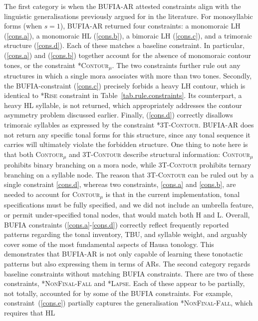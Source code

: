\documentclass{CUP-JNL-PHO}%
\theoremstyle{definition}
\numberwithin{equation}{section}
\theoremstyle{definition}
\begin{document}
The first category is when the BUFIA-AR attested constraints align
with the linguistic generalisations previously argued for in the
literature. For monosyllabic forms (when \(s=1\)), BUFIA-AR returned
four constraints: a monomoraic LH (\ref{cons.a}), a monomoraic HL
(\ref{cons.b}), a bimoraic LH (\ref{cons.c}), and a trimoraic
structure (\ref{cons.d}).  Each of these matches a baseline
constraint.  In particular, (\ref{cons.a}) and (\ref{cons.b}) together
account for the absence of monomoraic contour tones, or the constraint
\textsc{*Contour}$_\mu$. The two constraints further rule out any
structures in which a single mora associates with more than two
tones. Secondly, the BUFIA-constraint (\ref{cons.c}) precisely forbids 
a heavy LH contour, which is identical to \textsc{*Rise} constraint in
Table~\ref{tab.rule.constraints}. Its counterpart, a heavy HL
syllable, is not returned, which appropriately addresses the contour
asymmetry problem discussed earlier. Finally, (\ref{cons.d}) correctly
disallows trimoraic syllables as expressed by the constraint
\textsc{*3T-Contour}. BUFIA-AR does not return any specific tonal
forms for this structure, since any tonal sequence it carries will
ultimately violate the forbidden structure.
One thing to note here is that both \textsc{Contour}{$_\mu$} and
\textsc{3T-Contour} describe structural information:
\textsc{Contour}{$_\mu$} prohibits binary branching on a mora node,
while \textsc{3T-Contour} prohibits ternary branching on a syllable
node. The reason that \textsc{3T-Contour} can be ruled out by a single
constraint \ref{cons.d}, whereas two constraints, \ref{cons.a} and
\ref{cons.b}, are needed to account for \textsc{Contour}{$_\mu$} is
that in the current implementation, tonal specifications must be fully
specified, and we did not include an umbrella feature, or permit
under-specified tonal nodes, that would match both H and L.
Overall, BUFIA constraints (\ref{cons.a}-\ref{cons.d}) correctly
reflect frequently reported patterns regarding the tonal inventory,
TBU, and syllable weight, and arguably cover some of the most
fundamental aspects of Hausa tonology. This demonstrates that BUFIA-AR
is not only capable of learning these tonotactic patterns but also
expressing them in terms of ARs.
The second category regards baseline constraints without matching
BUFIA constraints. There are two of these constraints,
\textsc{*NonFinal-Fall} and \textsc{*Lapse}. Each of these appear to
be partially, not totally, accounted for by some of the BUFIA
constraints. For example, constraint~(\ref{cons.e}) partially captures
the generalisation \textsc{*NonFinal-Fall}, which requires that HL
\end{document}
